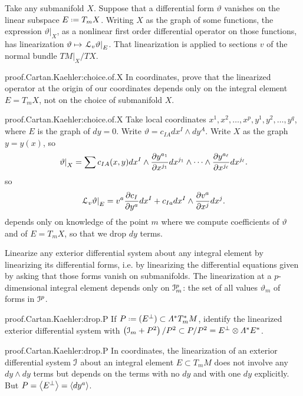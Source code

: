 Take any submanifold \(X\).
Suppose that a differential form \(\vartheta\) vanishes on the linear subspace \(E\defeq T_m X\).
Writing \(X\) as the graph of some functions, the expression \(\left.\vartheta\right|_X\), as a nonlinear first order differential operator on those functions, has linearization  \(\vartheta \mapsto \left.\EuScript L_v \vartheta\right|_E\).
That linearization is applied to sections \(v\) of the normal bundle \(\left.TM\right|_X/TX\).
\begin{problem}{proof.Cartan.Kaehler:choice.of.X}
In coordinates, prove that the linearized operator at the origin of our coordinates depends only on the integral element \(E=T_m X\), not on the choice of submanifold \(X\).
\end{problem}
\begin{answer}{proof.Cartan.Kaehler:choice.of.X}
Take local coordinates \(x^1,x^2,\dots,x^p, y^1,y^2,\dots,y^q\), where \(E\) is the graph of \(dy=0\). 
Write \(\vartheta = c_{IA} dx^I\wedge dy^A\).
Write \(X\) as the graph \(y=y(x)\), so
\[
\left.\vartheta\right|_X = \sum c_{IA}(x,y) dx^I \wedge 
\pderiv{y^{a_1}}{x^{j_1}} dx^{j_1} \wedge \dots \wedge \pderiv{y^{a_{\ell}}}{x^{j_{\ell}}} dx^{j_{\ell}}.
\]
so
\[
\left.\LieDer_v \vartheta\right|_E
=
v^a \pderiv{c_I}{y^a} dx^I
+ c_{Ia} dx^I \wedge \pderiv{v^a}{x^j} dx^j.
\]%
depends only on knowledge of the point \(m\) where we compute coefficients of \(\vartheta\) and of \(E=T_m X\), so that we drop \(dy\) terms.
\end{answer}
Linearize any exterior differential system about any integral element by linearizing its differential forms, i.e. by linearizing the differential equations given by asking that those forms vanish on submanifolds.
The linearization at a \(p\)-dimensional integral element depends only on \(\mathcal{I}^p_m\): the set of all values \(\vartheta_m\) of forms in \(\mathcal{I}^p\).
\begin{problem}{proof.Cartan.Kaehler:drop.P}
If \(P\defeq(E^{\perp})\subset \Lm{*}{T_m^*M}\), identify the linearized exterior differential system with \(\pr{\II_m + P^2}/P^2 \subset P/P^2 = E^{\perp} \otimes \Lm{*}{E}^*\).
\end{problem}
\begin{answer}{proof.Cartan.Kaehler:drop.P}
In coordinates, the linearization of an exterior differential system \(\mathcal{I}\) about an integral element \(E \subset T_m M\) does not involve any \(dy \wedge dy\) terms but depends on the terms with no \(dy\) and with one \(dy\) explicitly.
But \(P=\left<E^{\perp}\right>=\left<dy^a\right>\).
\end{answer}
